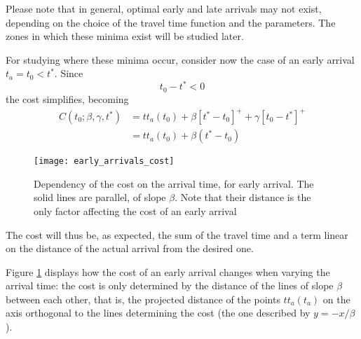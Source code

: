Please note that in general,
optimal early and late arrivals may not exist,
depending on the choice of the travel time function and the parameters.
The zones in which these minima exist will be studied later.

For studying where these minima occur, consider now the case of an early arrival \(t_a = t_0 < t^*\).
Since
\begin{equation*}
  t_0 - t^* < 0
\end{equation*}
the cost simplifies, becoming
\begin{align}
  C(t_0; \beta, \gamma, t^*) & = tt_a(t_0) + \beta[t^*- t_0]^+ + \gamma[t_0 - t^*]^+ \nonumber \\
                             & = tt_a(t_0) + \beta(t^*- t_0)\label{eq:cost_early}
\end{align}

\begin{figure}
  \centering
  \texttt{[image: early\_arrivals\_cost]}
  \caption{Dependency of the cost on the arrival time, for early arrival.
    The solid lines are parallel, of slope \(\beta\).
  Note that their distance is the only factor affecting the cost of an early arrival}
  \label{fig:early_arrivals_cost}
\end{figure}

The cost will thus be, as expected,
the sum of the travel time and a term linear on the distance of the actual arrival from the desired one.

Figure \ref{fig:early_arrivals_cost} displays how the cost of an early arrival changes when varying the arrival time:
the cost is only determined by the distance of the lines of slope \(\beta\) between each other, that is,
the projected distance of the points \(tt_a(t_a)\) on the axis orthogonal to the lines determining the cost
(the one described by \(y = -x/\beta\)).

